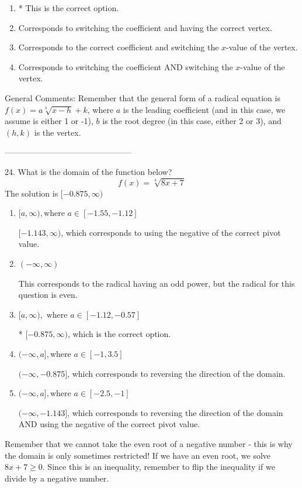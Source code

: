 \documentclass{extbook}[14pt]
\begin{document}
\begin{enumerate}[label=\Alph*.] 
\item * This is the correct option.  
\item Corresponds to switching the coefficient and having the correct vertex.  
\item Corresponds to the correct coefficient and switching the $x$-value of the vertex.  
\item Corresponds to switching the coefficient AND switching the $x$-value of the vertex.  
\end{enumerate} 
 
General Comments: Remember that the general form of a radical equation is $ f(x) = a \sqrt[b]{x - h} + k $, where $a$ is the leading coefficient (and in this case, we assume is either 1 or -1), $b$ is the root degree (in this case, either 2 or 3), and $(h, k)$ is the vertex.

-----------------------------------------------

24. What is the domain of the function below?
\[ f(x) = \sqrt[4]{8 x + 7} \] 
The solution is $ [-0.875, \infty) $ 

\begin{enumerate}[label=\Alph*.] 
\item $ [a, \infty), \text{where } a \in [-1.55, -1.12] $ 

 $[-1.143, \infty)$, which corresponds to using the negative of the correct pivot value. 
\item $ (-\infty, \infty) $ 

 This corresponds to the radical having an odd power, but the radical for this question is even. 
\item $ [a, \infty), \text{ where } a \in [-1.12, -0.57] $ 

 * $[-0.875, \infty)$, which is the correct option. 
\item $ (-\infty, a], \text{where } a \in [-1, 3.5] $ 

  $(-\infty, -0.875]$, which corresponds to reversing the direction of the domain. 
\item $ (-\infty, a], \text{where } a \in [-2.5, -1] $ 

 $(-\infty, -1.143]$, which corresponds to reversing the direction of the domain AND using the negative of the correct pivot value. 
\end{enumerate} 
 
Remember that we cannot take the even root of a negative number - this is why the domain is only sometimes restricted! If we have an even root, we solve $8 x + 7 \geq 0$. Since this is an inequality, remember to flip the inequality if we divide by a negative number.
\end{document}
